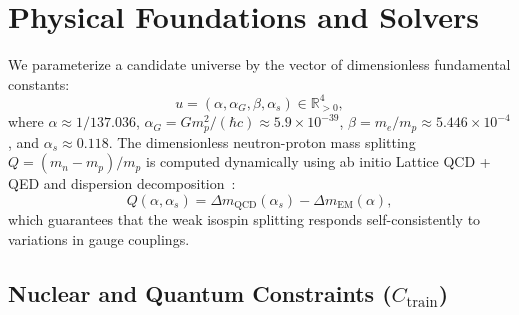 \documentclass[aps,prd,twocolumn,superscriptaddress,nofootinbib,floatfix]{revtex4-2}
\begin{document}
\section{Physical Foundations and Solvers}
\label{sec:physics}

We parameterize a candidate universe by the vector of dimensionless fundamental constants:
\begin{equation}
    u = (\alpha, \alpha_G, \beta, \alpha_s) \in \mathbb{R}^4_{>0},
\end{equation}
where $\alpha \approx 1/137.036$, $\alpha_G = G m_p^2 / (\hbar c) \approx 5.9 \times 10^{-39}$, $\beta = m_e / m_p \approx 5.446 \times 10^{-4}$, and $\alpha_s \approx 0.118$. The dimensionless neutron-proton mass splitting $Q = (m_n - m_p) / m_p$ is computed dynamically using ab initio Lattice QCD + QED and dispersion decomposition~\cite{Borsanyi2015,Cottingham1963}:
\begin{equation}
    Q(\alpha, \alpha_s) = \Delta m_{\text{QCD}}(\alpha_s) - \Delta m_{\text{EM}}(\alpha),
\end{equation}
which guarantees that the weak isospin splitting responds self-consistently to variations in gauge couplings.

\subsection{Nuclear and Quantum Constraints ($C_{\text{train}}$)}
\end{document}
